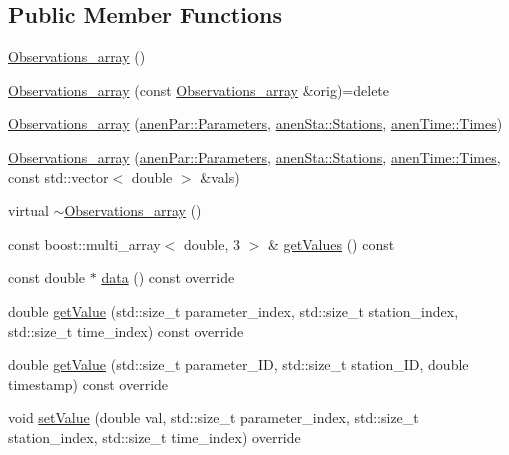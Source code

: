 \subsection*{Public Member Functions}
\begin{DoxyCompactItemize}
\item 
\mbox{\hyperlink{class_observations__array_ad161de2b3dd6537a040c2dbda002ccaf}{Observations\+\_\+array}} ()
\item 
\mbox{\hyperlink{class_observations__array_aa448781dd6c9c75fd3fa8ebf0e41e86d}{Observations\+\_\+array}} (const \mbox{\hyperlink{class_observations__array}{Observations\+\_\+array}} \&orig)=delete
\item 
\mbox{\hyperlink{class_observations__array_afff89d6d2bb295ae83c2dc02d2529ea3}{Observations\+\_\+array}} (\mbox{\hyperlink{classanen_par_1_1_parameters}{anen\+Par\+::\+Parameters}}, \mbox{\hyperlink{classanen_sta_1_1_stations}{anen\+Sta\+::\+Stations}}, \mbox{\hyperlink{classanen_time_1_1_times}{anen\+Time\+::\+Times}})
\item 
\mbox{\hyperlink{class_observations__array_a637c1332dca79ca5141ea513e86e1eb8}{Observations\+\_\+array}} (\mbox{\hyperlink{classanen_par_1_1_parameters}{anen\+Par\+::\+Parameters}}, \mbox{\hyperlink{classanen_sta_1_1_stations}{anen\+Sta\+::\+Stations}}, \mbox{\hyperlink{classanen_time_1_1_times}{anen\+Time\+::\+Times}}, const std\+::vector$<$ double $>$ \&vals)
\item 
virtual \mbox{\hyperlink{class_observations__array_a3124448be571f561a2bd2e8b44c95a2e}{$\sim$\+Observations\+\_\+array}} ()
\item 
const boost\+::multi\+\_\+array$<$ double, 3 $>$ \& \mbox{\hyperlink{class_observations__array_a68d81504c3672e1c34a8d8da3eee389b}{get\+Values}} () const
\item 
const double $\ast$ \mbox{\hyperlink{class_observations__array_a75c4a3fea9a8ccd370309058701204f4}{data}} () const override
\item 
double \mbox{\hyperlink{class_observations__array_a1d818317a4c3a6624021a6e44396ddc1}{get\+Value}} (std\+::size\+\_\+t parameter\+\_\+index, std\+::size\+\_\+t station\+\_\+index, std\+::size\+\_\+t time\+\_\+index) const override
\item 
double \mbox{\hyperlink{class_observations__array_a33f2154b3fed9d488e06e8c92eecc4db}{get\+Value}} (std\+::size\+\_\+t parameter\+\_\+\+ID, std\+::size\+\_\+t station\+\_\+\+ID, double timestamp) const override
\item 
void \mbox{\hyperlink{class_observations__array_aa6b6e042f8db0afad3beaff248b4a602}{set\+Value}} (double val, std\+::size\+\_\+t parameter\+\_\+index, std\+::size\+\_\+t station\+\_\+index, std\+::size\+\_\+t time\+\_\+index) override

\end{DoxyCompactItemize}
